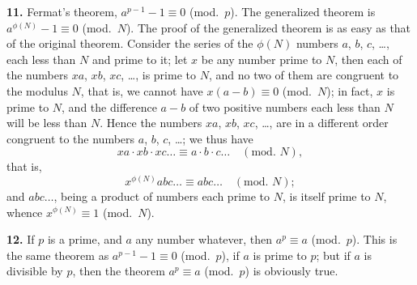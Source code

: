 \documentclass[11pt,a4paper]{article}
\begin{document}
\textbf{11.}\quad
Fermat's theorem, $a^{p-1} - 1 \equiv 0$ (mod.\ $p$). The generalized theorem is $a^{\phi(N)} - 1 \equiv 0$ (mod.\ $N$). The proof of the generalized theorem is as easy as that of the original theorem. Consider the series of the $\phi(N)$ numbers $a$, $b$, $c$, \ldots, each less than $N$ and prime to it; let $x$ be any number prime to $N$, then each of the numbers $xa$, $xb$, $xc$, \ldots, is prime to $N$, and no two of them are congruent to the modulus $N$, that is, we cannot have $x(a - b) \equiv 0$ (mod.\ $N$); in fact, $x$ is prime to $N$, and the difference $a - b$ of two positive numbers each less than $N$ will be less than $N$. Hence the numbers $xa$, $xb$, $xc$, \ldots, are in a different order congruent to the numbers $a$, $b$, $c$, \ldots; we thus have
\[
xa \cdot xb \cdot xc \ldots \equiv a \cdot b \cdot c \ldots \quad (\text{mod.\ } N),
\]
that is,
\[
x^{\phi(N)} abc \ldots \equiv abc \ldots \quad (\text{mod.\ } N);
\]
and $abc \ldots$, being a product of numbers each prime to $N$, is itself prime to $N$, whence $x^{\phi(N)} \equiv 1$ (mod.\ $N$).

\textbf{12.}\quad
If $p$ is a prime, and $a$ any number whatever, then $a^{p} \equiv a$ (mod.\ $p$). This is the same theorem as $a^{p-1} - 1 \equiv 0$ (mod.\ $p$), if $a$ is prime to $p$; but if $a$ is divisible by $p$, then the theorem $a^{p} \equiv a$ (mod.\ $p$) is obviously true.
\end{document}
